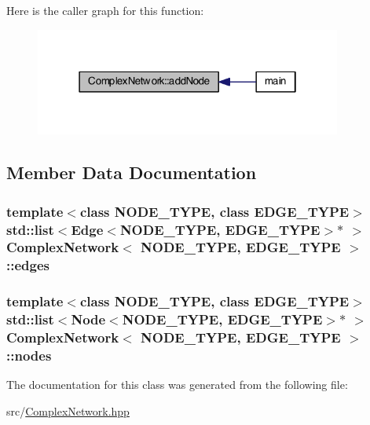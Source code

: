 Here is the caller graph for this function\+:\nopagebreak
\begin{figure}[H]
\begin{center}
\leavevmode
\includegraphics[width=286pt]{class_complex_network_a3e537a20ea5443faa9b4c8836615dad4_icgraph}
\end{center}
\end{figure}




\subsection{Member Data Documentation}
\hypertarget{class_complex_network_a7241d134d1dc4a4bfb21144fb0fa5520}{
\subsubsection[{edges}]{\setlength{\rightskip}{0pt plus 5cm}template$<$class N\+O\+D\+E\+\_\+\+T\+Y\+P\+E, class E\+D\+G\+E\+\_\+\+T\+Y\+P\+E$>$ std\+::list$<${\bf Edge}$<$N\+O\+D\+E\+\_\+\+T\+Y\+P\+E, E\+D\+G\+E\+\_\+\+T\+Y\+P\+E$>$$\ast$ $>$ {\bf Complex\+Network}$<$ N\+O\+D\+E\+\_\+\+T\+Y\+P\+E, E\+D\+G\+E\+\_\+\+T\+Y\+P\+E $>$\+::edges\hspace{0.3cm}{\ttfamily [private]}}}\label{class_complex_network_a7241d134d1dc4a4bfb21144fb0fa5520}
\hypertarget{class_complex_network_a03230eb6662d7d14b10e5ead9d5dea35}{
\subsubsection[{nodes}]{\setlength{\rightskip}{0pt plus 5cm}template$<$class N\+O\+D\+E\+\_\+\+T\+Y\+P\+E, class E\+D\+G\+E\+\_\+\+T\+Y\+P\+E$>$ std\+::list$<${\bf Node}$<$N\+O\+D\+E\+\_\+\+T\+Y\+P\+E, E\+D\+G\+E\+\_\+\+T\+Y\+P\+E$>$$\ast$ $>$ {\bf Complex\+Network}$<$ N\+O\+D\+E\+\_\+\+T\+Y\+P\+E, E\+D\+G\+E\+\_\+\+T\+Y\+P\+E $>$\+::nodes\hspace{0.3cm}{\ttfamily [private]}}}\label{class_complex_network_a03230eb6662d7d14b10e5ead9d5dea35}


The documentation for this class was generated from the following file\+:\begin{DoxyCompactItemize}
\item 
src/\hyperlink{_complex_network_8hpp}{Complex\+Network.\+hpp}\end{DoxyCompactItemize}
